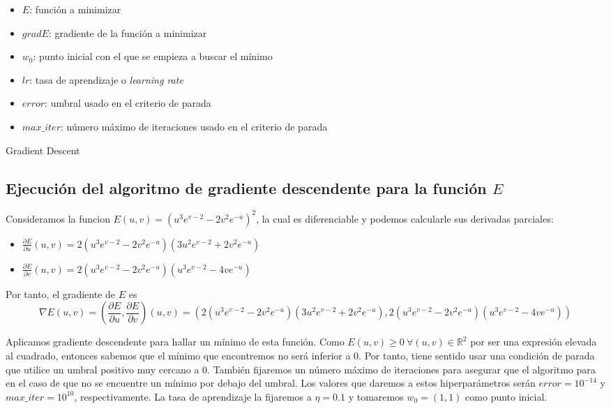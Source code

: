 \documentclass[10pt,a4paper]{article}
\begin{document}
\begin{itemize}
	\item $E$: función a minimizar
	\item $gradE$: gradiente de la función a minimizar
	\item $w_0$: punto inicial con el que se empieza a buscar el mínimo
	\item $lr$: tasa de aprendizaje o \textit{learning rate}
	\item $error$: umbral usado en el criterio de parada
	\item $max\_iter$: número máximo de iteraciones usado en el criterio de parada
\end{itemize}


\begin{algorithm}[H]
	\caption{Gradient Descent}
\end{algorithm}



\subsection{Ejecución del algoritmo de gradiente descendente para la función $E$}

Consideramos la funcion $E(u,v) = (u^3 e^{v-2}-2 v^2 e^{-u})^2$, la cual es diferenciable y podemos calcularle sus derivadas parciales:

\begin{itemize}
	\item $\frac{\partial E}{\partial u}(u,v) = 2(u^3 e^{v-2}-2 v^2 e^{-u}) (3 u^2 e^{v-2} + 2 v^2 e^{-u})$
	\item $\frac{\partial E}{\partial v}(u,v) = 2 (u^3 e^{v-2} - 2 v^2 e^{-u}) (u^3 e^{v-2} - 4 v e^{-u})$
\end{itemize}

Por tanto, el gradiente de $E$ es $$\nabla E(u,v) = (\frac{\partial E}{\partial u},\frac{\partial E}{\partial v})(u,v) = (2(u^3 e^{v-2}-2 v^2 e^{-u}) (3 u^2 e^{v-2} + 2 v^2 e^{-u}), 2 (u^3 e^{v-2} - 2 v^2 e^{-u}) (u^3 e^{v-2} - 4 v e^{-u}))$$

Aplicamos gradiente descendente para hallar un mínimo de esta función. Como $E(u,v) \geq 0 \ \forall (u,v) \in \mathbb{R}^2$ por ser una expresión elevada al cuadrado, entonces sabemos que el mínimo que encontremos no será inferior a 0. Por tanto, tiene sentido usar una condición de parada que utilice un umbral positivo muy cercano a 0. También fijaremos un número máximo de iteraciones para asegurar que el algoritmo para en el caso de que no se encuentre un mínimo por debajo del umbral. Los valores que daremos a estos hiperparámetros serán $error = 10^{-14}$ y $max\_iter = 10^{10}$, respectivamente. La tasa de aprendizaje la fijaremos a $\eta = 0.1$ y tomaremos $w_0 = (1,1)$ como punto inicial.
\end{document}
